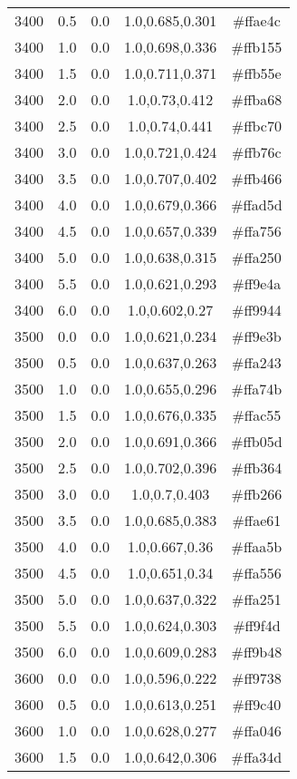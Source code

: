 \begin{tabular}{ccccc}
3400 & 0.5 & 0.0 & 1.0,0.685,0.301 & \#ffae4c \\ 
3400 & 1.0 & 0.0 & 1.0,0.698,0.336 & \#ffb155 \\ 
3400 & 1.5 & 0.0 & 1.0,0.711,0.371 & \#ffb55e \\ 
3400 & 2.0 & 0.0 & 1.0,0.73,0.412 & \#ffba68 \\ 
3400 & 2.5 & 0.0 & 1.0,0.74,0.441 & \#ffbc70 \\ 
3400 & 3.0 & 0.0 & 1.0,0.721,0.424 & \#ffb76c \\ 
3400 & 3.5 & 0.0 & 1.0,0.707,0.402 & \#ffb466 \\ 
3400 & 4.0 & 0.0 & 1.0,0.679,0.366 & \#ffad5d \\ 
3400 & 4.5 & 0.0 & 1.0,0.657,0.339 & \#ffa756 \\ 
3400 & 5.0 & 0.0 & 1.0,0.638,0.315 & \#ffa250 \\ 
3400 & 5.5 & 0.0 & 1.0,0.621,0.293 & \#ff9e4a \\ 
3400 & 6.0 & 0.0 & 1.0,0.602,0.27 & \#ff9944 \\ 
3500 & 0.0 & 0.0 & 1.0,0.621,0.234 & \#ff9e3b \\ 
3500 & 0.5 & 0.0 & 1.0,0.637,0.263 & \#ffa243 \\ 
3500 & 1.0 & 0.0 & 1.0,0.655,0.296 & \#ffa74b \\ 
3500 & 1.5 & 0.0 & 1.0,0.676,0.335 & \#ffac55 \\ 
3500 & 2.0 & 0.0 & 1.0,0.691,0.366 & \#ffb05d \\ 
3500 & 2.5 & 0.0 & 1.0,0.702,0.396 & \#ffb364 \\ 
3500 & 3.0 & 0.0 & 1.0,0.7,0.403 & \#ffb266 \\ 
3500 & 3.5 & 0.0 & 1.0,0.685,0.383 & \#ffae61 \\ 
3500 & 4.0 & 0.0 & 1.0,0.667,0.36 & \#ffaa5b \\ 
3500 & 4.5 & 0.0 & 1.0,0.651,0.34 & \#ffa556 \\ 
3500 & 5.0 & 0.0 & 1.0,0.637,0.322 & \#ffa251 \\ 
3500 & 5.5 & 0.0 & 1.0,0.624,0.303 & \#ff9f4d \\ 
3500 & 6.0 & 0.0 & 1.0,0.609,0.283 & \#ff9b48 \\ 
3600 & 0.0 & 0.0 & 1.0,0.596,0.222 & \#ff9738 \\ 
3600 & 0.5 & 0.0 & 1.0,0.613,0.251 & \#ff9c40 \\ 
3600 & 1.0 & 0.0 & 1.0,0.628,0.277 & \#ffa046 \\ 
3600 & 1.5 & 0.0 & 1.0,0.642,0.306 & \#ffa34d \\ 

\end{tabular}
